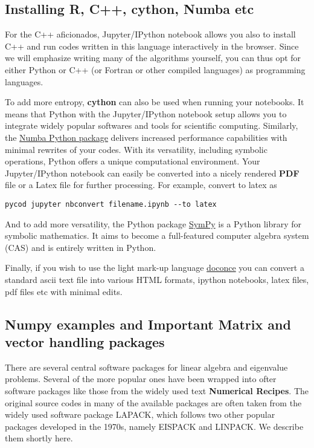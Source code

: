 \documentclass[%
oneside,                 %
final,                   %
10pt]{article}
\begin{document}
\subsection*{Installing R, C++, cython, Numba etc}


For the C++ aficionados, Jupyter/IPython notebook allows you also to
install C++ and run codes written in this language interactively in
the browser. Since we will emphasize writing many of the algorithms
yourself, you can thus opt for either Python or C++ (or Fortran or other compiled languages) as programming
languages.

To add more entropy, \textbf{cython} can also be used when running your
notebooks. It means that Python with the Jupyter/IPython notebook
setup allows you to integrate widely popular softwares and tools for
scientific computing. Similarly, the 
\href{{https://numba.pydata.org/}}{Numba Python package} delivers increased performance
capabilities with minimal rewrites of your codes.  With its
versatility, including symbolic operations, Python offers a unique
computational environment. Your Jupyter/IPython notebook can easily be
converted into a nicely rendered \textbf{PDF} file or a Latex file for
further processing. For example, convert to latex as 

\begin{Verbatim}[numbers=none,fontsize=\fontsize{9pt}{9pt},baselinestretch=0.95]
pycod jupyter nbconvert filename.ipynb --to latex 
\end{Verbatim}

And to add more versatility, the Python package \href{{http://www.sympy.org/en/index.html}}{SymPy} is a Python library for symbolic mathematics. It aims to become a full-featured computer algebra system (CAS)  and is entirely written in Python. 

Finally, if you wish to use the light mark-up language 
\href{{https://github.com/hplgit/doconce}}{doconce} you can convert a standard ascii text file into various HTML 
formats, ipython notebooks, latex files, pdf files etc with minimal edits.



\subsection*{Numpy examples and Important Matrix and vector handling packages}

There are several central software packages for linear algebra and eigenvalue problems. Several of the more
popular ones have been wrapped into ofter software packages like those from the widely used text \textbf{Numerical Recipes}. The original source codes in many of the available packages are often taken from the widely used
software package LAPACK, which follows two other popular packages
developed in the 1970s, namely EISPACK and LINPACK.  We describe them shortly here.
\end{document}
